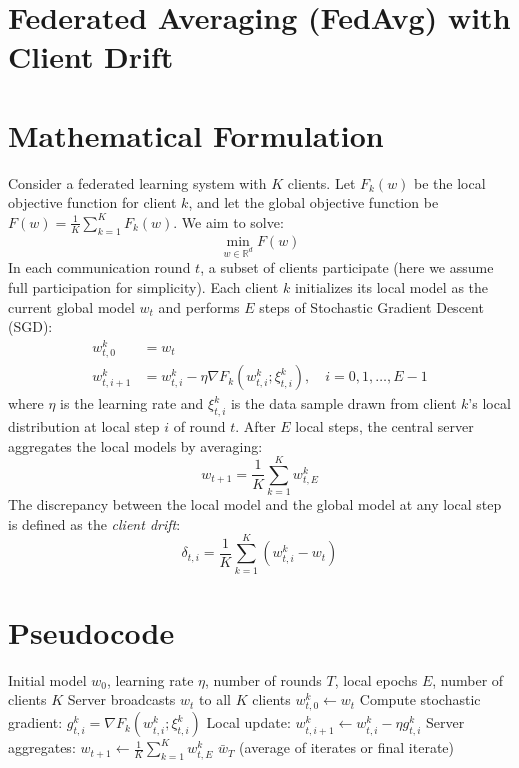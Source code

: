 \documentclass{article}
\begin{document}
\section*{Federated Averaging (FedAvg) with Client Drift}
\section*{Mathematical Formulation}
Consider a federated learning system with $K$ clients. Let $F_k(w)$ be the local objective function for client $k$, and let the global objective function be $F(w) = \frac{1}{K} \sum_{k=1}^K F_k(w)$. We aim to solve:
$$ \min_{w \in \mathbb{R}^d} F(w) $$
In each communication round $t$, a subset of clients participate (here we assume full participation for simplicity). Each client $k$ initializes its local model as the current global model $w_t$ and performs $E$ steps of Stochastic Gradient Descent (SGD):
\begin{align}
w_{t,0}^k &= w_t \\
w_{t,i+1}^k &= w_{t,i}^k - \eta \nabla F_k(w_{t,i}^k; \xi_{t,i}^k), \quad i = 0, 1, \dots, E-1
\end{align}
where $\eta$ is the learning rate and $\xi_{t,i}^k$ is the data sample drawn from client $k$'s local distribution at local step $i$ of round $t$. After $E$ local steps, the central server aggregates the local models by averaging:
$$ w_{t+1} = \frac{1}{K} \sum_{k=1}^K w_{t,E}^k $$
The discrepancy between the local model and the global model at any local step is defined as the \textit{client drift}:
$$ \delta_{t,i} = \frac{1}{K} \sum_{k=1}^K (w_{t,i}^k - w_t) $$

\section*{Pseudocode}
\begin{algorithm}[H]
\caption{Federated Averaging (FedAvg)}
\begin{algorithmic}[1]
\Require Initial model $w_0$, learning rate $\eta$, number of rounds $T$, local epochs $E$, number of clients $K$
    \State Server broadcasts $w_t$ to all $K$ clients
        \State $w_{t,0}^k \gets w_t$
            \State Compute stochastic gradient: $g_{t,i}^k = \nabla F_k(w_{t,i}^k; \xi_{t,i}^k)$
            \State Local update: $w_{t,i+1}^k \gets w_{t,i}^k - \eta g_{t,i}^k$
        \EndFor
    \EndFor
    \State Server aggregates: $w_{t+1} \gets \frac{1}{K} \sum_{k=1}^K w_{t,E}^k$
\EndFor
\Ensure $\bar{w}_T$ (average of iterates or final iterate)
\end{algorithmic}
\end{algorithm}
\end{document}
